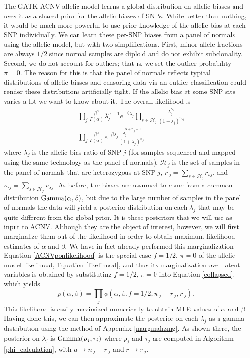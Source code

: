 \documentclass[nofootinbib,amssymb,amsmath]{revtex4}
\begin{document}
The GATK ACNV allelic model learns a global distribution on allelic biases and uses it as a shared prior for the allelic biases of SNPs.  While better than nothing, it would be much more powerful to use prior knowledge of the allelic bias at each SNP individually.  We can learn these per-SNP biases from a panel of normals using the allelic model, but with two simplifications.  First, minor allele fractions are always $1/2$ since normal samples are diploid and do not exhibit subclonality.  Second, we do not account for outliers; that is, we set the outlier probability $\pi = 0$.  The reason for this is that the panel of normals reflects typical distributions of allelic biases and censoring data via an outlier classification could render these distributions artificially tight.  If the allelic bias at some SNP site varies a lot we want to know about it. The overall likelihood is
%
\begin{align}
& \prod_j \frac{\beta^\alpha}{\Gamma(\alpha)} \lambda_j^{\alpha - 1} e^{-\beta \lambda_j}
\prod_{s \in \mathcal{H}_j}
 \frac{  \lambda_j^{r_{sj}}}{ \left( 1 + \lambda_j \right)^{n_{sj}}}  \\
 = & \prod_j \frac{\beta^\alpha}{\Gamma(\alpha)} e^{-\beta \lambda_j}
 \frac{  \lambda_j^{\alpha + r_{ \cdot j} - 1}}{ \left( 1 + \lambda_j \right)^{n_{\cdot j}}} 
 \label{ACNVponlikelihood}
\end{align}
%
where $\lambda_j$ is the allelic bias ratio of SNP $j$ (for samples sequenced and mapped using the same technology as the panel of normals), $\mathcal{H}_j$ is the set of samples in the panel of normals that are heterozygous at SNP $j$, $r_{\cdot j} = \sum_{s \in \mathcal{H}_j} r_{sj}$, and $n_{\cdot j} = \sum_{s \in \mathcal{H}_j} n_{sj}$.  As before, the biases are assumed to come from a common distribution ${\rm Gamma}(\alpha, \beta)$, but due to the large number of samples in the panel of normals the data will yield a posterior distribution on each $\lambda_j$ that may be quite different from the global prior.  It is these posteriors that we will use as input to ACNV.  Although they are the object of interest, however, we will first marginalize them out of the likelihood in order to obtain maximum likelihood estimates of $\alpha$ and $\beta$.  We have in fact already performed this marginalization -- Equation \ref{ACNVponlikelihood} is the special case $f = 1/2$, $\pi = 0$ of the allelic-model likelihood, Equation \ref{likelihood}, and thus its marginalization over latent variables is obtained by substituting $f = 1/2$, $\pi = 0$ into Equation \ref{collapsed}, which yields
%
\begin{equation}
p(\alpha, \beta) = \prod_j \phi(\alpha, \beta, f = 1/2, n_{\cdot j} - r_{\cdot j}, r_{\cdot j}).
\end{equation}
%
This likelihood is easily maximized numerically to obtain MLE values of $\alpha$ and $\beta$.  Having done this, we can then approximate the posterior on each $\lambda_j$ as a gamma distribution using the method of Appendix \ref{marginalizing}.  As shown there, the posterior on $\lambda_j$ is ${\rm Gamma}(\rho_j, \tau_j)$ where $\rho_j$ and $\tau_j$ are computed in Algorithm \ref{phi_calculation}, with $a \rightarrow n_{\cdot j} - r_{\cdot j}$ and $r \rightarrow r_{\cdot j}$.
\end{document}
